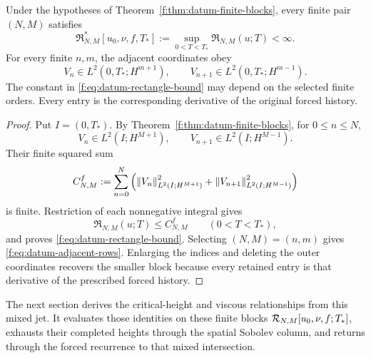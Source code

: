 \begin{theorem}
\label{f:thm:datum-rectangles}
Under the hypotheses of Theorem~\ref{f:thm:datum-finite-blocks}, every finite
pair \((N,M)\) satisfies
\begin{equation}
 \mathfrak R_{N,M}^*[u_0,\nu,f,T_*]
 :=\sup_{0<T<T_*}\mathfrak R_{N,M}(u;T)<\infty.
 \label{f:eq:datum-rectangle-bound}
\end{equation}
For every finite \(n,m\), the adjacent coordinates obey
\begin{equation}
 V_n\in L^2(0,T_*;H^{m+1}),
 \qquad
 V_{n+1}\in L^2(0,T_*;H^{m-1}).
 \label{f:eq:datum-adjacent-rows}
\end{equation}
The constant in \eqref{f:eq:datum-rectangle-bound} may depend on the selected
finite orders.  Every entry is the corresponding derivative of the original
forced history.
\end{theorem}

\begin{proof}
Put \(I=(0,T_*)\).  By Theorem~\ref{f:thm:datum-finite-blocks}, for
\(0\le n\le N\),
\[
 V_n\in L^2(I;H^{M+1}),\qquad
 V_{n+1}\in L^2(I;H^{M-1}).
\]
Their finite squared sum
\[
 C^f_{N,M}:=\sum_{n=0}^{N}\left(
 \left\lVert V_n\right\rVert_{L^2(I;H^{M+1})}^2
 +\left\lVert V_{n+1}\right\rVert_{L^2(I;H^{M-1})}^2
 \right)
\]
is finite.  Restriction of each nonnegative integral gives
\[
 \mathfrak R_{N,M}(u;T)\le C^f_{N,M}
 \qquad(0<T<T_*),
\]
and proves \eqref{f:eq:datum-rectangle-bound}.  Selecting \((N,M)=(n,m)\)
gives \eqref{f:eq:datum-adjacent-rows}.  Enlarging the indices and deleting the
outer coordinates recovers the smaller block because every retained entry is
that derivative of the prescribed forced history.
\end{proof}

The next section derives the critical-height and viscous relationships from
this mixed jet.  It evaluates those identities on these finite
blocks \(\mathcal R_{N,M}[u_0,\nu,f;T_*]\), exhausts their completed heights through
the spatial Sobolev column, and returns through the forced recurrence to that mixed intersection.
